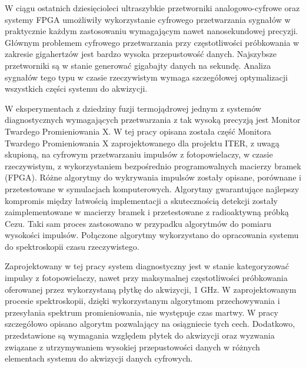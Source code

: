 W ciągu ostatnich dziesięcioleci ultraszybkie przetworniki analogowo-cyfrowe
oraz systemy FPGA umożliwiły wykorzystanie cyfrowego przetwarzania sygnałów 
w praktycznie każdym zastosowaniu wymagającym nawet nanosekundowej precyzji.
Głównym problemem cyfrowego przetwarzania przy częstotliwości próbkowania w 
zakresie gigahertzów jest bardzo wysoka przepustowość danych. Najszybsze przetworniki
są w stanie generować gigabajty danych na sekundę. Analiza sygnałów tego typu 
w czasie rzeczywistym wymaga szczegółowej optymalizacji wszystkich części 
systemu do akwizycji.


W eksperymentach z dziedziny fuzji termojądrowej jednym z systemów diagnostycznych
wymagających przetwarzania z tak wysoką precyzją jest Monitor Twardego Promieniowania X.
W tej pracy opisana została część Monitora Twardego Promieniowania X 
zaprojektowanego dla projektu ITER, z uwagą skupioną, na cyfrowym przetwarzaniu
impulsów z fotopowielaczy, w czasie rzeczywistym, z wykorzystaniem bezpośrednio
programowalnych macierzy bramek (FPGA). Różne algorytmy do wykrywania 
impulsów zostały opisane, porównane i przetestowane w symulacjach komputerowych.
Algorytmy gwarantujące najlepszy kompromis między łatwością implementacji 
a skutecznością detekcji zostały zaimplementowane w macierzy bramek i przetestowane 
z radioaktywną próbką Cezu. Taki sam proces zastosowano w przypadku
algorytmów do pomiaru wysokości impulsów. Połączone algorytmy wykorzystano
do opracowania systemu do spektroskopii czasu rzeczywistego.


Zaprojektowany w tej pracy system diagnostyczny jest w stanie kategoryzować 
impulsy z fotopowielaczy, nawet przy maksymalnej częstotliwości próbkowania 
oferowanej przez wykorzystaną płytkę do akwizycji, 1 GHz. W zaprojektowanym 
procesie spektroskopii, dzięki wykorzystanym algorytmom przechowywania i
przesyłania spektrum promieniowania, nie występuje czas martwy.
W pracy szczegółowo opisano algorytm pozwalający na osiągniecie tych cech.
Dodatkowo, przedstawione są wymagania względem płytek do akwizycji oraz wyzwania
związane z utrzymywaniem wysokiej przepustowości danych w różnych elementach systemu
do akwizycji danych cyfrowych. 

